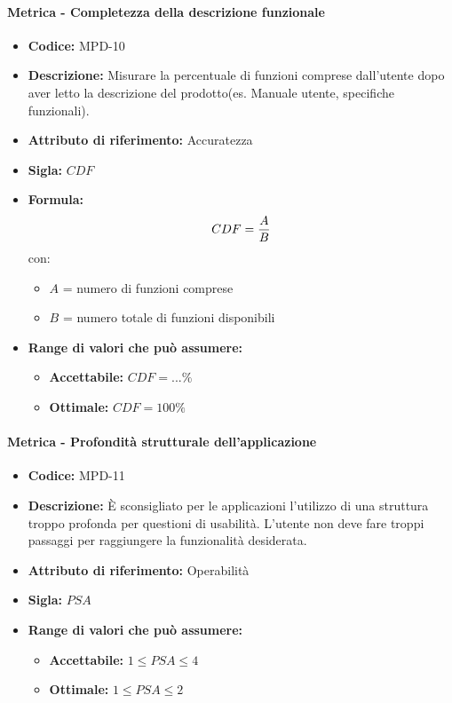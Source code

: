     \paragraph{Metrica - Completezza della descrizione funzionale} 
        \begin{itemize}
            \item   \textbf{Codice:} MPD-10
            \item   \textbf{Descrizione:} Misurare la percentuale di funzioni comprese dall'utente dopo aver letto la descrizione del prodotto(es. Manuale utente, specifiche funzionali).
            \item    \textbf{Attributo di riferimento:} Accuratezza
            \item   \textbf{Sigla:} $CDF$
            \item   \textbf{Formula:} $$CDF = {A \over B}$$
            con:
            \begin{itemize}
            \item  $A$ = numero di funzioni comprese
            \item  $B$ = numero totale di funzioni disponibili
            \end{itemize}

            \item \textbf{Range di valori che può assumere:}
            \begin{itemize}
                \item \textbf{Accettabile:} $CDF = ...\% $
                \item \textbf{Ottimale:} $CDF = 100\% $
            \end{itemize}
        \end{itemize}

    \paragraph{Metrica - Profondità strutturale dell'applicazione}
    \begin{itemize}
        \item \textbf{Codice:} MPD-11
        \item \textbf{Descrizione:} È sconsigliato per le applicazioni l'utilizzo di una struttura troppo profonda per questioni di usabilità. L'utente non deve fare troppi passaggi per raggiungere la funzionalità desiderata. 
        \item \textbf{Attributo di riferimento:} Operabilità
        \item \textbf{Sigla:} $PSA$
        \item \textbf{Range di valori che può assumere:}
        \begin{itemize}
            \item \textbf{Accettabile:} $1 \leq PSA \leq 4$
            \item \textbf{Ottimale:} $1 \leq PSA \leq 2$
        \end{itemize}
    \end{itemize}

